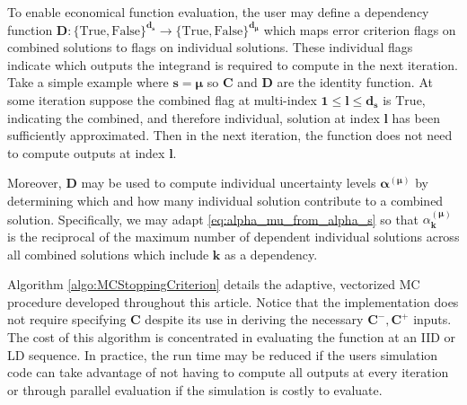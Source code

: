 \documentclass[graybox]{svmult}
\begin{document}
To enable economical function evaluation, the user may define a dependency function $\boldsymbol{D}: \{\text{True},\text{False}\}^{\boldsymbol{d}_{\boldsymbol{s}}} \to \{\text{True},\text{False}\}^{\boldsymbol{d}_{\boldsymbol{\mu}}}$ which maps error criterion flags on combined solutions to flags on individual solutions. These individual flags indicate which outputs the integrand is required to compute in the next iteration. Take a simple example where  $\boldsymbol{s}=\boldsymbol{\mu}$ so $\boldsymbol{C}$ and $\boldsymbol{D}$ are the identity function. At some iteration suppose the combined flag at multi-index $\boldsymbol{1} \leq \boldsymbol{l} \leq \boldsymbol{d}_{\boldsymbol{s}}$ is $\text{True}$, indicating the combined, and therefore individual, solution at index $\boldsymbol{l}$ has been sufficiently approximated. Then in the next iteration, the function does not need to compute outputs at index $\boldsymbol{l}$.

Moreover, $\boldsymbol{D}$ may be used to compute individual uncertainty levels $\boldsymbol{\alpha}^{(\boldsymbol{\mu})}$ by determining which and how many individual solution contribute to a combined solution. Specifically, we may adapt \eqref{eq:alpha_mu_from_alpha_s} so that 
$\alpha_{\boldsymbol{k}}^{(\boldsymbol{\mu})}$ is the reciprocal of the maximum number of dependent individual solutions across all combined solutions which include $\boldsymbol{k}$ as a dependency.

Algorithm \ref{algo:MCStoppingCriterion} details the adaptive, vectorized MC procedure developed throughout this article. Notice that the implementation does not require specifying $\boldsymbol{C}$ despite its use in deriving the necessary $\boldsymbol{C}^-,\boldsymbol{C}^+$ inputs. The cost of this algorithm is concentrated in evaluating the function at an IID or LD sequence. In practice, the run time may be reduced if the users simulation code can take advantage of not having to compute all outputs at every iteration or through parallel evaluation if the simulation is costly to evaluate.
\end{document}
